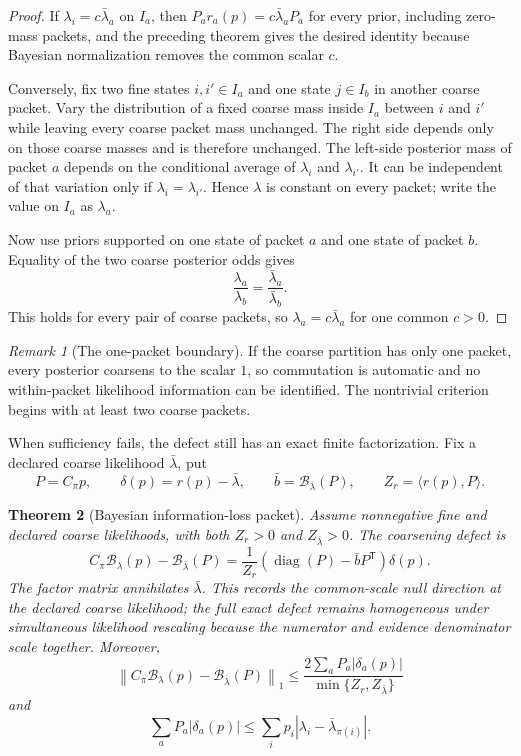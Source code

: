 \documentclass[11pt,a4paper]{article}
\newtheorem{theorem}{Theorem}[section]
\theoremstyle{definition}
\theoremstyle{remark}
\newtheorem{remark}[theorem]{Remark}
\newcommand{\cB}{\mathcal B}
\newcommand{\diag}{\operatorname{diag}}
\begin{document}
\begin{proof}
If $\lambda_i=c\bar\lambda_a$ on $I_a$, then $P_a r_a(p)=c\bar\lambda_aP_a$ for every prior, including zero-mass packets, and the preceding theorem gives the desired identity because Bayesian normalization removes the common scalar $c$.

Conversely, fix two fine states $i,i'\in I_a$ and one state $j\in I_b$ in another coarse packet.  Vary the distribution of a fixed coarse mass inside $I_a$ between $i$ and $i'$ while leaving every coarse packet mass unchanged.  The right side depends only on those coarse masses and is therefore unchanged.  The left-side posterior mass of packet $a$ depends on the conditional average of $\lambda_i$ and $\lambda_{i'}$.  It can be independent of that variation only if $\lambda_i=\lambda_{i'}$.  Hence $\lambda$ is constant on every packet; write the value on $I_a$ as $\lambda_a$.

Now use priors supported on one state of packet $a$ and one state of packet $b$.  Equality of the two coarse posterior odds gives
\[
\frac{\lambda_a}{\lambda_b}
=
\frac{\bar\lambda_a}{\bar\lambda_b}.
\]
This holds for every pair of coarse packets, so $\lambda_a=c\bar\lambda_a$ for one common $c>0$.
\end{proof}

\begin{remark}[The one-packet boundary]\label{core:record:022}
If the coarse partition has only one packet, every posterior coarsens to the scalar $1$, so commutation is automatic and no within-packet likelihood information can be identified.  The nontrivial criterion begins with at least two coarse packets.
\end{remark}

When sufficiency fails, the defect still has an exact finite factorization.  Fix a declared coarse likelihood $\bar\lambda$, put
\[
P=C_\pi p,
\qquad
\delta(p)=r(p)-\bar\lambda,
\qquad
\bar b=\cB_{\bar\lambda}(P),
\qquad
Z_r=\langle r(p),P\rangle.
\]

\begin{theorem}[Bayesian information-loss packet]\label{core:record:023}
Assume nonnegative fine and declared coarse likelihoods, with both $Z_r>0$ and $Z_{\bar\lambda}>0$. The coarsening defect is
\[
\boxed{
C_\pi\cB_\lambda(p)
-
\cB_{\bar\lambda}(P)
=
\frac{1}{Z_r}
\left(\diag(P)-\bar bP^{\mathsf T}\right)
\delta(p).}
\]
The factor matrix annihilates $\bar\lambda$.  This records the common-scale null direction at the declared coarse likelihood; the full exact defect remains homogeneous under simultaneous likelihood rescaling because the numerator and evidence denominator scale together.  Moreover,
\[
\boxed{
\left\|C_\pi\cB_\lambda(p)-\cB_{\bar\lambda}(P)\right\|_1
\le
\frac{2\sum_aP_a|\delta_a(p)|}
{\min\{Z_r,Z_{\bar\lambda}\}}}
\]
and
\[
\sum_aP_a|\delta_a(p)|
\le
\sum_i p_i\left|\lambda_i-\bar\lambda_{\pi(i)}\right|.
\]
\end{theorem}
\end{document}
